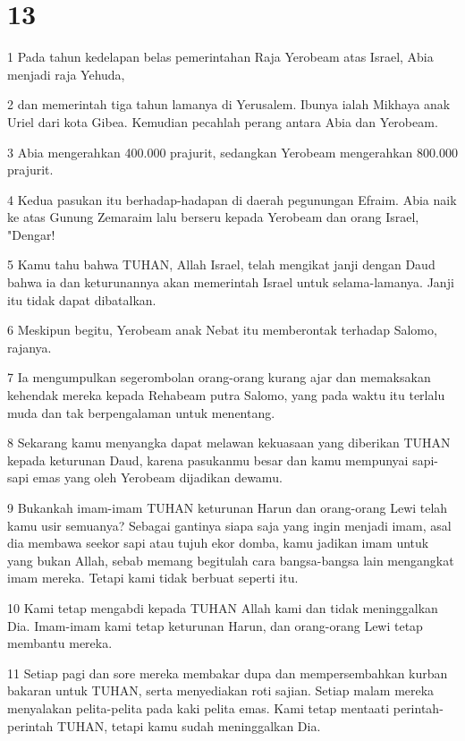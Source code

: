 \chapter{13}

\par 1 Pada tahun kedelapan belas pemerintahan Raja Yerobeam atas Israel, Abia menjadi raja Yehuda,
\par 2 dan memerintah tiga tahun lamanya di Yerusalem. Ibunya ialah Mikhaya anak Uriel dari kota Gibea. Kemudian pecahlah perang antara Abia dan Yerobeam.
\par 3 Abia mengerahkan 400.000 prajurit, sedangkan Yerobeam mengerahkan 800.000 prajurit.
\par 4 Kedua pasukan itu berhadap-hadapan di daerah pegunungan Efraim. Abia naik ke atas Gunung Zemaraim lalu berseru kepada Yerobeam dan orang Israel, "Dengar!
\par 5 Kamu tahu bahwa TUHAN, Allah Israel, telah mengikat janji dengan Daud bahwa ia dan keturunannya akan memerintah Israel untuk selama-lamanya. Janji itu tidak dapat dibatalkan.
\par 6 Meskipun begitu, Yerobeam anak Nebat itu memberontak terhadap Salomo, rajanya.
\par 7 Ia mengumpulkan segerombolan orang-orang kurang ajar dan memaksakan kehendak mereka kepada Rehabeam putra Salomo, yang pada waktu itu terlalu muda dan tak berpengalaman untuk menentang.
\par 8 Sekarang kamu menyangka dapat melawan kekuasaan yang diberikan TUHAN kepada keturunan Daud, karena pasukanmu besar dan kamu mempunyai sapi-sapi emas yang oleh Yerobeam dijadikan dewamu.
\par 9 Bukankah imam-imam TUHAN keturunan Harun dan orang-orang Lewi telah kamu usir semuanya? Sebagai gantinya siapa saja yang ingin menjadi imam, asal dia membawa seekor sapi atau tujuh ekor domba, kamu jadikan imam untuk yang bukan Allah, sebab memang begitulah cara bangsa-bangsa lain mengangkat imam mereka. Tetapi kami tidak berbuat seperti itu.
\par 10 Kami tetap mengabdi kepada TUHAN Allah kami dan tidak meninggalkan Dia. Imam-imam kami tetap keturunan Harun, dan orang-orang Lewi tetap membantu mereka.
\par 11 Setiap pagi dan sore mereka membakar dupa dan mempersembahkan kurban bakaran untuk TUHAN, serta menyediakan roti sajian. Setiap malam mereka menyalakan pelita-pelita pada kaki pelita emas. Kami tetap mentaati perintah-perintah TUHAN, tetapi kamu sudah meninggalkan Dia.
